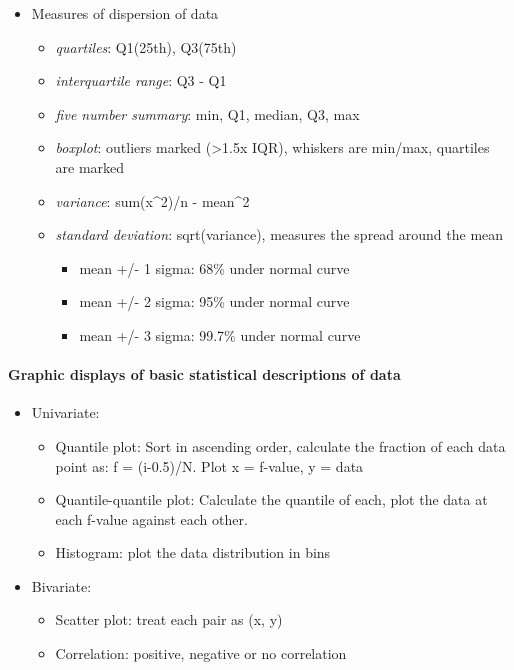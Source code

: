 \documentclass[11pt]{article}
\providecommand{\tightlist}{%
      \setlength{\itemsep}{0pt}\setlength{\parskip}{0pt}}
\begin{document}
    \begin{itemize}
\tightlist
\item
  Measures of dispersion of data

  \begin{itemize}
  \tightlist
  \item
    \emph{quartiles}: Q1(25th), Q3(75th)
  \item
    \emph{interquartile range}: Q3 - Q1
  \item
    \emph{five number summary}: min, Q1, median, Q3, max
  \item
    \emph{boxplot}: outliers marked (\textgreater{}1.5x IQR), whiskers
    are min/max, quartiles are marked
  \item
    \emph{variance}: sum(x\^{}2)/n - mean\^{}2
  \item
    \emph{standard deviation}: sqrt(variance), measures the spread
    around the mean

    \begin{itemize}
    \tightlist
    \item
      mean +/- 1 sigma: 68\% under normal curve
    \item
      mean +/- 2 sigma: 95\% under normal curve
    \item
      mean +/- 3 sigma: 99.7\% under normal curve
    \end{itemize}
  \end{itemize}
\end{itemize}

    \paragraph{Graphic displays of basic statistical descriptions of
data}\label{graphic-displays-of-basic-statistical-descriptions-of-data}

    \begin{itemize}
\tightlist
\item
  Univariate:

  \begin{itemize}
  \tightlist
  \item
    Quantile plot: Sort in ascending order, calculate the fraction of
    each data point as: f = (i-0.5)/N. Plot x = f-value, y = data
  \item
    Quantile-quantile plot: Calculate the quantile of each, plot the
    data at each f-value against each other.
  \item
    Histogram: plot the data distribution in bins
  \end{itemize}
\item
  Bivariate:

  \begin{itemize}
  \tightlist
  \item
    Scatter plot: treat each pair as (x, y)
  \item
    Correlation: positive, negative or no correlation
  \end{itemize}
\end{itemize}
\end{document}
